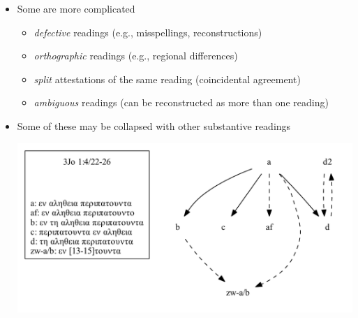 \documentclass[10pt]{beamer}
\begin{document}
	\begin{frame}
		\begin{itemize}
			\item Some are more complicated
			\begin{itemize}
				\item \emph{defective} readings (e.g., misspellings, reconstructions)
				\item \emph{orthographic} readings (e.g., regional differences)
				\item \emph{split} attestations of the same reading (coincidental agreement)
				\item \emph{ambiguous} readings (can be reconstructed as more than one reading)
			\end{itemize}
			\item Some of these may be collapsed with other substantive readings
			\begin{center}
				\includegraphics[scale=0.5]{../img/B25K1V4U22-26-local-stemma-ignore-defective-ignore-ambiguous-merge-splits.pdf}
			\end{center}
		\end{itemize}
	\end{frame}
\end{document}
